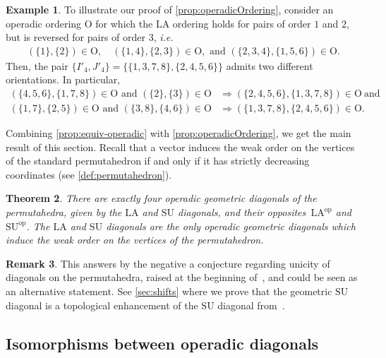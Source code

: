 \documentclass{amsart}
\newtheorem{theorem}{Theorem}[section]
\theoremstyle{definition}
\newtheorem{example}[theorem]{Example}
\newtheorem{remark}[theorem]{Remark}
\newcommand{\Or}{\mathrm{O}} %
\newcommand{\ie}{\textit{i.e.}~} %
\newcommand{\SU}{\mathrm{SU}}
\newcommand{\LA}{\mathrm{LA}}
\newcommand{\op}{\mathrm{op}}
\begin{document}
\begin{example} 
\label{ex:Non-coherent order contradiction}
To illustrate our proof of \cref{prop:operadicOrdering}, consider an operadic ordering $\Or$ for which the $\LA$ ordering holds for pairs of order $1$ and $2$, but is reversed for pairs of order $3$, \ie
\begin{align*}
(\{1\}, \{2\}) \in \Or, \quad (\{1,4\}, \{2,3\}) \in \Or, \text{ and } (\{2, 3, 4\}, \{1, 5, 6 \}) \in \Or.
\end{align*}
Then, the pair $\{I'_4,J'_4\}=\{\{1, 3, 7, 8\}, \{2, 4, 5, 6\}\}$ admits two different orientations.
In particular, 
\begin{align*}
(\{ 4, 5, 6 \} , \{1, 7, 8\}) \in \Or \text{ and } (\{2\}, \{3\}) \in \Or & \Longrightarrow (\{2, 4, 5, 6\}, \{1, 3, 7, 8\} ) \in \Or \ \text{and} \\
(\{1, 7\}, \{2, 5\}) \in \Or \text{ and } (\{3, 8\}, \{4, 6\}) \in \Or & \Longrightarrow (\{1, 3, 7, 8\}, \{2, 4, 5, 6\}) \in \Or.
\end{align*}
\end{example}

Combining \cref{prop:equiv-operadic} with \cref{prop:operadicOrdering}, we get the main result of this section.
Recall that a vector induces the weak order on the vertices of the standard permutahedron if and only if it has strictly decreasing coordinates (see \cref{def:permutahedron}).

\begin{theorem}
\label{thm:unique-operadic}
There are exactly four operadic geometric diagonals of the permutahedra, given by the $\LA$ and $\SU$ diagonals, and their opposites~$\LA^{\op}$ and $\SU^{\op}$. 
The $\LA$ and $\SU$ diagonals are the only operadic geometric diagonals which induce the weak order on the vertices of the permutahedron.
\end{theorem}

\begin{remark}
This answers by the negative a conjecture regarding unicity of diagonals on the permutahedra, raised at the beginning of~\cite[Sect.~3]{SaneblidzeUmble}, and could be seen as an alternative statement. 
See \cref{sec:shifts} where we prove that the geometric $\SU$ diagonal is a topological enhancement of the $\SU$ diagonal from~\cite{SaneblidzeUmble}.
\end{remark}


\subsection{Isomorphisms between operadic diagonals}
\label{subsec:isos-LA-SU}
\end{document}
